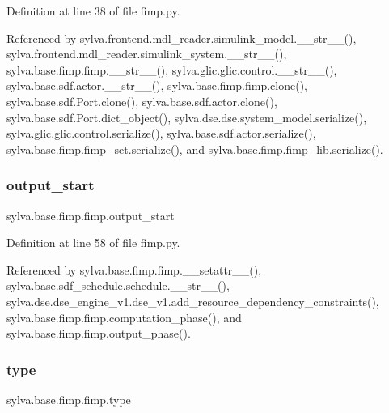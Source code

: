 Definition at line 38 of file fimp.\+py.



Referenced by sylva.\+frontend.\+mdl\+\_\+reader.\+simulink\+\_\+model.\+\_\+\+\_\+str\+\_\+\+\_\+(), sylva.\+frontend.\+mdl\+\_\+reader.\+simulink\+\_\+system.\+\_\+\+\_\+str\+\_\+\+\_\+(), sylva.\+base.\+fimp.\+fimp.\+\_\+\+\_\+str\+\_\+\+\_\+(), sylva.\+glic.\+glic.\+control.\+\_\+\+\_\+str\+\_\+\+\_\+(), sylva.\+base.\+sdf.\+actor.\+\_\+\+\_\+str\+\_\+\+\_\+(), sylva.\+base.\+fimp.\+fimp.\+clone(), sylva.\+base.\+sdf.\+Port.\+clone(), sylva.\+base.\+sdf.\+actor.\+clone(), sylva.\+base.\+sdf.\+Port.\+dict\+\_\+object(), sylva.\+dse.\+dse.\+system\+\_\+model.\+serialize(), sylva.\+glic.\+glic.\+control.\+serialize(), sylva.\+base.\+sdf.\+actor.\+serialize(), sylva.\+base.\+fimp.\+fimp\+\_\+set.\+serialize(), and sylva.\+base.\+fimp.\+fimp\+\_\+lib.\+serialize().

\mbox{\label{classsylva_1_1base_1_1fimp_1_1fimp_a2782f46c3a7713c9c9d7ff5be05615a8}} 
\subsubsection{\texorpdfstring{output\+\_\+start}{output\_start}}
{\footnotesize\ttfamily sylva.\+base.\+fimp.\+fimp.\+output\+\_\+start}



Definition at line 58 of file fimp.\+py.



Referenced by sylva.\+base.\+fimp.\+fimp.\+\_\+\+\_\+setattr\+\_\+\+\_\+(), sylva.\+base.\+sdf\+\_\+schedule.\+schedule.\+\_\+\+\_\+str\+\_\+\+\_\+(), sylva.\+dse.\+dse\+\_\+engine\+\_\+v1.\+dse\+\_\+v1.\+add\+\_\+resource\+\_\+dependency\+\_\+constraints(), sylva.\+base.\+fimp.\+fimp.\+computation\+\_\+phase(), and sylva.\+base.\+fimp.\+fimp.\+output\+\_\+phase().

\mbox{\label{classsylva_1_1base_1_1fimp_1_1fimp_a2a0ef56805a0a4b151421c183d7b78ca}} 
\subsubsection{\texorpdfstring{type}{type}}
{\footnotesize\ttfamily sylva.\+base.\+fimp.\+fimp.\+type}




